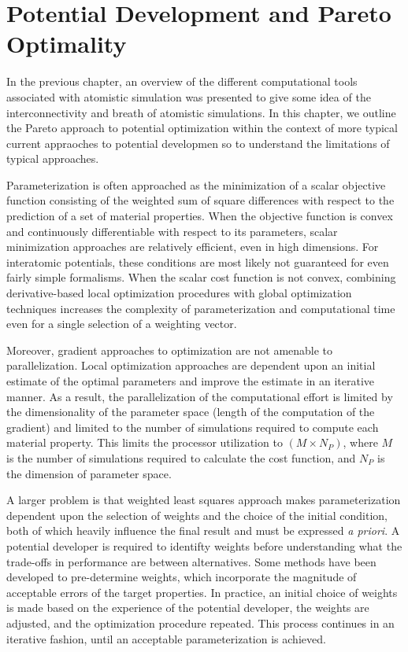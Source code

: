 \chapter{Potential Development and Pareto Optimality}
\label{ch:potential_development}

In the previous chapter, an overview of the different computational tools associated with atomistic simulation was presented to give some idea of the interconnectivity and breath of atomistic simulations.  In this chapter, we outline the Pareto approach to potential optimization within the context of more typical current appraoches to potential developmen so to understand the limitations of typical approaches.

Parameterization is often approached as the minimization of a scalar objective function consisting of the weighted sum of square differences with respect to the prediction of a set of material properties.  When the objective function is convex and continuously differentiable with respect to its parameters, scalar minimization approaches are relatively efficient, even in high dimensions.  For interatomic potentials, these conditions are most likely not guaranteed for even fairly simple formalisms.  When the scalar cost function is not convex, combining derivative-based local optimization procedures with global optimization techniques increases the complexity of parameterization and computational time even for a single selection of a weighting vector.

Moreover, gradient approaches to optimization are not amenable to parallelization.  Local optimization approaches are dependent upon an initial estimate of the optimal parameters and improve the estimate in an iterative manner.  As a result, the parallelization of the computational effort is limited by the dimensionality of the parameter space (length of the computation of the gradient) and limited to the number of simulations required to compute each material property.  This limits the processor utilization to $(M \times N_P)$, where $M$ is the number of simulations required to calculate the cost function, and $N_P$ is the dimension of parameter space.

A larger problem is that weighted least squares approach makes parameterization dependent upon the selection of weights and the choice of the initial condition, both of which heavily influence the final result and must be expressed \emph{a priori}. A potential developer is required to identifty weights before understanding what the trade-offs in performance are between alternatives.  Some methods have been developed to pre-determine weights, which incorporate the magnitude of acceptable errors of the target properties\cite{martinez2013_fitting}.  In practice, an initial choice of weights is made based on the experience of the potential developer, the weights are adjusted, and the optimization procedure repeated.  This process continues in an iterative fashion, until an acceptable parameterization is achieved.


